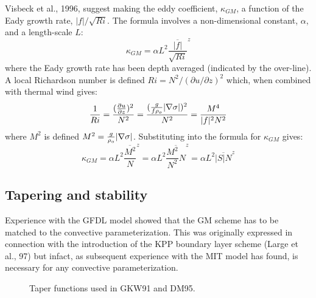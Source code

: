 Visbeck et al., 1996, suggest making the eddy coefficient,
$\kappa_{GM}$, a function of the Eady growth rate,
$|f|/\sqrt{Ri}$. The formula involves a non-dimensional constant,
$\alpha$, and a length-scale $L$:
\begin{displaymath}
\kappa_{GM} = \alpha L^2 \overline{ \frac{|f|}{\sqrt{Ri}} }^z
\end{displaymath}
where the Eady growth rate has been depth averaged (indicated by the
over-line). A local Richardson number is defined $Ri = N^2 / (\partial
u/\partial z)^2$ which, when combined with thermal wind gives:
\begin{displaymath}
\frac{1}{Ri} = \frac{(\frac{\partial u}{\partial z})^2}{N^2} =
\frac{ ( \frac{g}{f \rho_o} | {\bf \nabla} \sigma | )^2 }{N^2} =
\frac{ M^4 }{ |f|^2 N^2 }
\end{displaymath}
where $M^2$ is defined $M^2 = \frac{g}{\rho_o} |{\bf \nabla} \sigma|$.
Substituting into the formula for $\kappa_{GM}$ gives:
\begin{displaymath}
\kappa_{GM} = \alpha L^2 \overline{ \frac{M^2}{N} }^z =
\alpha L^2 \overline{ \frac{M^2}{N^2} N }^z =
\alpha L^2 \overline{ |S| N }^z
\end{displaymath}


\subsection{Tapering and stability}

Experience with the GFDL model showed that the GM scheme has to be
matched to the convective parameterization. This was originally
expressed in connection with the introduction of the KPP boundary
layer scheme (Large et al., 97) but infact, as subsequent experience
with the MIT model has found, is necessary for any convective
parameterization.


\begin{figure}
\begin{center}
\end{center}
\caption{Taper functions used in GKW91 and DM95.}
\label{fig:tapers}
\end{figure}

